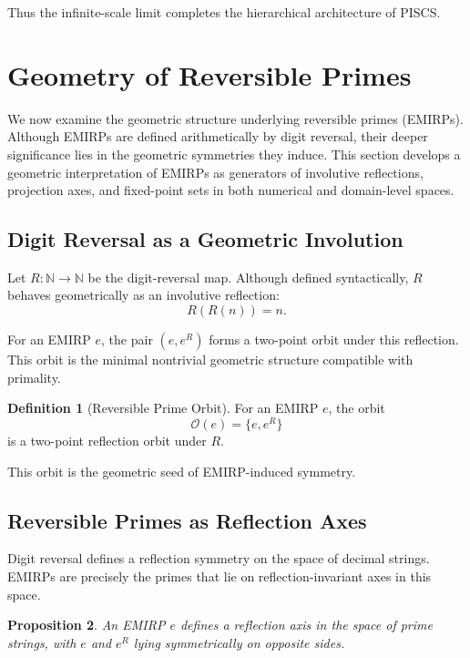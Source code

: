 \documentclass[11pt]{article}
\theoremstyle{definition}
\newtheorem{definition}{Definition}[section]
\theoremstyle{plain}
\newtheorem{proposition}[definition]{Proposition}
\theoremstyle{remark}
\begin{document}
Thus the infinite-scale limit completes the hierarchical architecture of
PISCS.

\section{Geometry of Reversible Primes}

We now examine the geometric structure underlying reversible primes
(EMIRPs). Although EMIRPs are defined arithmetically by digit reversal,
their deeper significance lies in the geometric symmetries they induce.
This section develops a geometric interpretation of EMIRPs as generators
of involutive reflections, projection axes, and fixed-point sets in both
numerical and domain-level spaces.

\subsection{Digit Reversal as a Geometric Involution}

Let $R : \mathbb{N} \to \mathbb{N}$ be the digit-reversal map. Although
defined syntactically, $R$ behaves geometrically as an involutive
reflection:
\[
R(R(n)) = n.
\]

For an EMIRP $e$, the pair $(e, e^R)$ forms a two-point orbit under this
reflection. This orbit is the minimal nontrivial geometric structure
compatible with primality.

\begin{definition}[Reversible Prime Orbit]
For an EMIRP $e$, the orbit
\[
\mathcal{O}(e) = \{e, e^R\}
\]
is a two-point reflection orbit under $R$.
\end{definition}

This orbit is the geometric seed of EMIRP-induced symmetry.

\subsection{Reversible Primes as Reflection Axes}

Digit reversal defines a reflection symmetry on the space of decimal
strings. EMIRPs are precisely the primes that lie on reflection-invariant
axes in this space.

\begin{proposition}
An EMIRP $e$ defines a reflection axis in the space of prime strings,
with $e$ and $e^R$ lying symmetrically on opposite sides.
\end{proposition}
\end{document}
